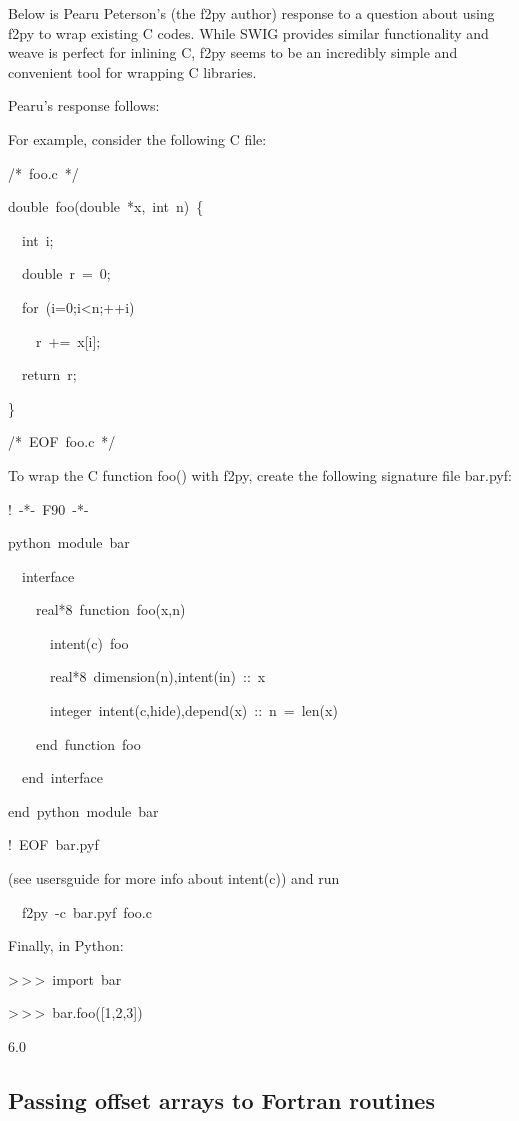 Below is Pearu Peterson's (the f2py author) response to a question
about using f2py to wrap existing C codes. While SWIG provides similar
functionality and weave is perfect for inlining C, f2py seems to be
an incredibly simple and convenient tool for wrapping C libraries.

Pearu's response follows: 

For example, consider the following C file:

\begin{lyxcode}
/{*}~foo.c~{*}/

double~foo(double~{*}x,~int~n)~\{

~~int~i;

~~double~r~=~0;

~~for~(i=0;i<n;++i)

~~~~r~+=~x{[}i];

~~return~r;

\}

/{*}~EOF~foo.c~{*}/
\end{lyxcode}
To wrap the C function foo() with f2py, create the following signature
file bar.pyf: 

\begin{lyxcode}
!~-{*}-~F90~-{*}-

python~module~bar

~~interface

~~~~real{*}8~function~foo(x,n)

~~~~~~intent(c)~foo

~~~~~~real{*}8~dimension(n),intent(in)~::~x

~~~~~~integer~intent(c,hide),depend(x)~::~n~=~len(x)

~~~~end~function~foo

~~end~interface

end~python~module~bar

!~EOF~bar.pyf
\end{lyxcode}
(see usersguide for more info about intent(c)) and run

\begin{lyxcode}
~~f2py~-c~bar.pyf~foo.c
\end{lyxcode}
Finally, in Python:

\begin{lyxcode}
>\,{}>\,{}>~import~bar

>\,{}>\,{}>~bar.foo({[}1,2,3])

6.0
\end{lyxcode}

\subsection{Passing offset arrays to Fortran routines}

